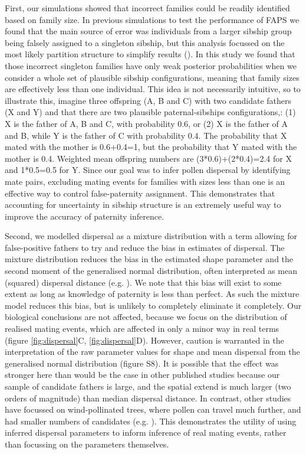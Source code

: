 \documentclass[10pt, a4paper, twocolumn]{article} %
\begin{document}
First, our simulations showed that incorrect families could be readily identified based on family size.
In previous simulations to test the performance of FAPS we found that the main source of error was individuals from a larger sibship group being falsely assigned to a singleton sibship, but this analysis focussed on the most likely partition structure to simplify results (\cite{ellis2018efficient}).
In this study we found that those incorrect singleton families have only weak posterior probabilities when we consider a whole set of plausible sibship configurations, meaning that family sizes are effectively less than one individual.
This idea is not necessarily intuitive, so to illustrate this, imagine three offspring (A, B and C) with two candidate fathers (X and Y) and that there are two plausible paternal-sibships configurations,: (1) X is the father of A, B and C, with probability 0.6, or (2) X is the father of A and B, while Y is the father of C with probability 0.4.
The probability that X mated with the mother is 0.6+0.4=1, but the probability that Y mated with the mother is 0.4.
Weighted mean offspring numbers are (3*0.6)+(2*0.4)=2.4 for X and 1*0.5=0.5 for Y.
Since our goal was to infer pollen dispersal by identifying mate pairs, excluding mating events for families with sizes less than one is an effective way to control false-paternity assignment.
This demonstrates that accounting for uncertainty in sibship structure is an extremely useful way to improve the accuracy of paternity inference.

Second, we modelled dispersal as a mixture distribution with a term allowing for false-positive fathers to try and reduce the bias in estimates of dispersal.
The mixture distribution reduces the bias in the estimated shape parameter and the second moment of the generalised normal distribution, often interpreted as mean (squared) dispersal distance (e.g. \cite{clark1998trees, austerlitz2004using, klein2008pollen}).
We note that this bias will exist to some extent as long as knowledge of paternity is less than perfect.
As such the mixture model reduces this bias, but is unlikely to completely eliminate it completely.
Our biological conclusions are not affected, because we focus on the distribution of realised mating events, which are affected in only a minor way in real terms (figure \ref{fig:dispersal}C, \ref{fig:dispersal}D).
However, caution is warranted in the interpretation of the raw parameter values for shape and mean dispersal from the generalised normal distribution (figure S8).
It is possible that the effect was stronger here than would be the case in other published studies because our sample of candidate fathers is large, and the spatial extend is much larger (two orders of magnitude) than median dispersal distance.
In contrast, other studies have focussed on wind-pollinated trees, where pollen can travel much further, and had smaller numbers of candidates (e.g. \cite{adams1992using, austerlitz2004using, klein2008pollen}).
This demonstrates the utility of using inferred dispersal parameters to inform inference of real mating events, rather than focussing on the parameters themselves.
\end{document}
